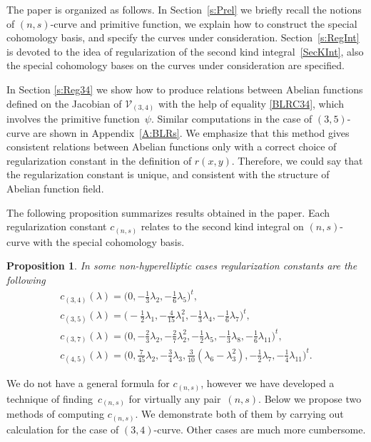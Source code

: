 \documentclass[pdftex]{sigma}
\numberwithin{equation}{section}
\newtheorem{Proposition}[Theorem]{Proposition}
 { \theoremstyle{definition}
\newtheorem{Remark}[Theorem]{Remark} }
\begin{document}
The paper is organized as follows. In Section~\ref{s:Prel} we briefly recall the notions of $(n,s)$-curve and primitive function, we explain how to construct the special cohomology basis, and specify the curves under consideration. Section~\ref{s:RegInt} is devoted to the idea of regularization of the second kind integral~\eqref{SecKInt}, also the special cohomology bases on the curves under consideration are specified.

In Section \ref{s:Reg34} we show how to produce relations between Abelian functions defined on the Jacobian of $\mathcal{V}_{(3,4)}$ with the help of equality \eqref{BLRC34}, which involves the primitive function~$\psi$. Si\-mi\-lar computations in the case of $(3,5)$-curve are shown in Appendix~\ref{A:BLRs}. We emphasize that this method gives consistent relations between Abelian functions only with a correct choice of regularization constant in the definition of $r(x,y)$. Therefore, we could say that the regularization constant is unique, and consistent with the structure of Abelian function field.

The following proposition summarizes results obtained in the paper. Each regularization constant $c_{(n,s)}$ relates to the second kind integral on $(n,s)$-curve with the special cohomology basis.
\begin{Proposition}
In some non-hyperelliptic cases regularization constants are the following
 \begin{gather*}
 c_{(3,4)}(\lambda) = \big(0, -\tfrac{1}{3}\lambda_2, {-}\tfrac{1}{6}\lambda_5 \big)^t,\\
 c_{(3,5)}(\lambda) = \big({-}\tfrac{1}{2}\lambda_1, -\tfrac{4}{15}\lambda_1^2, -\tfrac{1}{3}\lambda_4, {-}\tfrac{1}{6}\lambda_7 \big)^t,\\
 c_{(3,7)}(\lambda) = \big(0,{-}\tfrac{2}{3}\lambda_2,{-}\tfrac{2}{7}\lambda_2^2,{-}\tfrac{1}{2}\lambda_5,
 {-}\tfrac{1}{3}\lambda_8,{-}\tfrac{1}{6}\lambda_{11}\big)^t,\\
 c_{(4,5)}(\lambda) = \big(0, \tfrac{7}{45}\lambda_2, -\tfrac{3}{4}\lambda_3, \tfrac{3}{10}(\lambda_6-\lambda_3^2),
 -\tfrac{1}{2}\lambda_7, {-}\tfrac{1}{4}\lambda_{11} \big)^t.
\end{gather*}
\end{Proposition}
We do not have a general formula for $c_{(n,s)}$, however we have developed a technique of finding~$c_{(n,s)}$ for virtually any pair~$(n,s)$. Below we propose two methods of computing $c_{(n,s)}$. We demonstrate both of them by carrying out calculation for the case of $(3,4)$-curve. Other cases are much more cumbersome.
\end{document}
